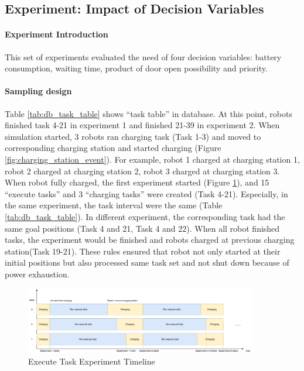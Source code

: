 \subsection{Experiment: Impact of Decision Variables}

\paragraph{Experiment Introduction} 
This set of experiments evaluated the need of four decision variables: battery consumption, waiting time, product of door open possibility and priority. 

\paragraph{Sampling design}
Table \ref{tab:db_task_table} shows ``task table'' in database. At this point, robots finished task 4-21 in experiment 1 and finished 21-39 in experiment 2. When simulation started, 3 robots ran charging task (Task 1-3) and moved to corresponding charging station and started charging (Figure \ref{fig:charging_station_event}). For example, robot 1 charged at charging station 1, robot 2 charged at charging station 2, robot 3 charged at charging station 3. 
When robot fully charged, the first experiment started (Figure \ref{fig:execute_task_experiment_timeline}), and 15 ``execute tasks'' and 3 ``charging tasks'' were created (Task 4-21). Especially, in the same experiment, the task interval were the same (Table \ref{tab:db_task_table}). In different experiment, the corresponding task had the same goal positions (Task 4 and 21, Task 4 and 22). 
When all robot finished tasks, the experiment would be finished and robots charged at previous charging station(Task 19-21).
These rules ensured that robot not only started at their initial positions but also processed same task set and not shut down because of power exhaustion.


\begin{figure}[htbp]
    \centering
    \includegraphics[width = 0.9\textwidth]{content/images/ch5/exe_exp_timeline.drawio.png}
    \caption{Execute Task Experiment Timeline}
    \label{fig:execute_task_experiment_timeline}
\end{figure}


